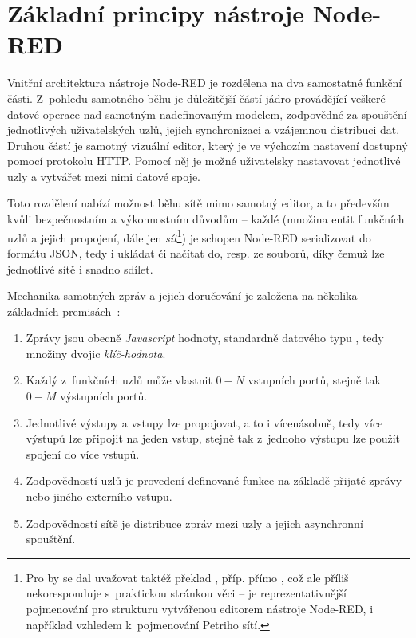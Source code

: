 \section{Základní principy nástroje Node-RED}\label{sec:zakladni-principy-node-red}

Vnitřní architektura nástroje Node-RED je rozdělena na dva samostatné funkční části.
Z~pohledu samotného běhu je důležitější částí jádro provádějící veškeré datové operace nad samotným nadefinovaným
modelem, zodpovědné za spouštění jednotlivých uživatelských uzlů, jejich synchronizaci a vzájemnou distribuci dat.
Druhou částí je samotný vizuální editor, který je ve výchozím nastavení dostupný pomocí protokolu HTTP. Pomocí něj je
možné uživatelsky nastavovat jednotlivé uzly a vytvářet mezi nimi datové spoje.

Toto rozdělení nabízí možnost běhu sítě mimo samotný editor, a to především kvůli bezpečnostním a
výkonnostním důvodům -- každé  (množina entit funkčních uzlů a jejich propojení, dále jen
\emph{sít}\footnote{Pro  by se dal uvažovat taktéž překlad ,
příp. přímo , což ale příliš nekoresponduje s~praktickou stránkou věci --  je reprezentativnější
pojmenování pro strukturu vytvářenou editorem nástroje Node-RED, i například vzhledem k~pojmenování Petriho sítí.}) je
schopen Node-RED serializovat do formátu JSON, tedy i ukládat či načítat do, resp. ze souborů, díky čemuž lze jednotlivé
sítě i snadno sdílet.

Mechanika samotných zpráv a jejich doručování je založena na několika základních premisách~\cite{NodeRedFlows}:
\begin{enumerate}
    \item Zprávy jsou obecně \emph{Javascript} hodnoty, standardně datového typu ,
    tedy množiny dvojic \emph{klíč-hodnota}.
    \item Každý z~funkčních uzlů může vlastnit $0-N$ vstupních portů, stejně tak $0-M$ výstupních portů.
    \item Jednotlivé výstupy a vstupy lze propojovat, a to i vícenásobně, tedy více výstupů lze připojit na jeden vstup,
    stejně tak z~jednoho výstupu lze použít spojení do více vstupů.
    \item Zodpovědností uzlů je provedení definované funkce na základě přijaté zprávy nebo
    jiného externího vstupu.
    \item Zodpovědností sítě je distribuce zpráv mezi uzly a jejich asynchronní spouštění.
\end{enumerate}

